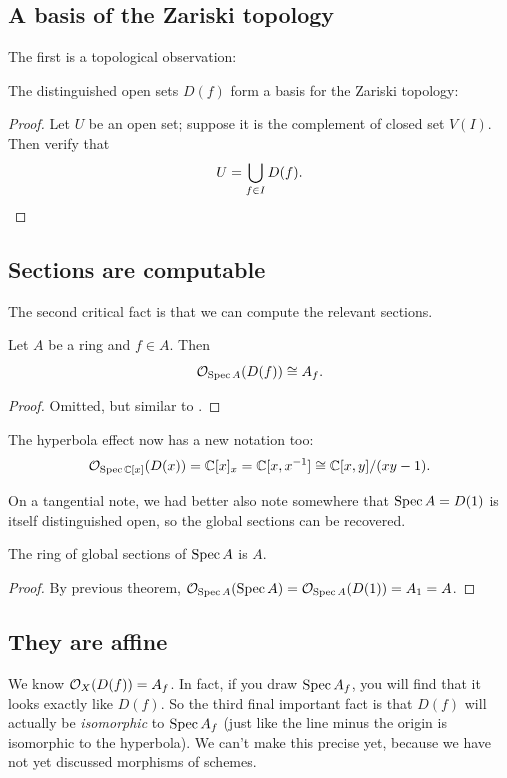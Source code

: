 \subsection{A basis of the Zariski topology}
The first is a topological observation:
\begin{theorem}
	The distinguished open sets $D(f)$
	form a basis for the Zariski topology:
\end{theorem}
\begin{proof}
	Let $U$ be an open set;
	suppose it is the complement of closed set $V(I)$.
	Then verify that \[ U = \bigcup_{f \in I} D(f). \qedhere \]
\end{proof}

\subsection{Sections are computable}
The second critical fact is that we can compute the relevant sections.
\begin{theorem}
	Let $A$ be a ring and $f \in A$.
	Then \[ \mathcal O_{\operatorname{Spec} A}(D(f)) \cong A_f. \]
\end{theorem}
\begin{proof}
	Omitted, but similar to
	.
\end{proof}

\begin{example}
	The hyperbola effect now has a new notation too:
	\[ \mathcal O_{\operatorname{Spec} \mathbb C[x]} (D(x))
		= \mathbb C[x]_{x} = \mathbb C[x, x^{-1}]
		\cong \mathbb C[x,y] / (xy-1). \]
\end{example}

On a tangential note,
we had better also note somewhere that $\operatorname{Spec} A = D(1)$
is itself distinguished open, so the global sections can be recovered.
\begin{corollary}
	The ring of global sections of $\operatorname{Spec} A$ is $A$.
\end{corollary}
\begin{proof}
	By previous theorem, $\mathcal O_{\operatorname{Spec} A}(\operatorname{Spec} A)
	= \mathcal O_{\operatorname{Spec} A}(D(1)) = A_1 = A$.
\end{proof}

\subsection{They are affine}
We know $\mathcal O_X(D(f)) = A_f$.
In fact, if you draw $\operatorname{Spec} A_f$,
you will find that it looks exactly like $D(f)$.
So the third final important fact is that
$D(f)$ will actually be \emph{isomorphic} to $\operatorname{Spec} A_f$
(just like the line minus the origin is isomorphic to the hyperbola).
We can't make this precise yet,
because we have not yet discussed morphisms of schemes.

